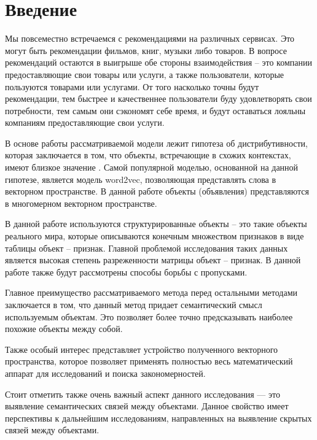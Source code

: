 \chapter*{Введение} %

Мы повсеместно встречаемся с рекомендациями на различных сервисах. Это могут быть рекомендации фильмов, книг, музыки либо товаров. В вопросе рекомендаций остаются в выигрыше обе стороны взаимодействия – это компании предоставляющие свои товары или услуги, а также пользователи, которые пользуются товарами или услугами. От того насколько точны будут рекомендации, тем
быстрее и качественнее пользователи буду удовлетворять свои потребности, тем самым они сэкономят себе время, и будут оставаться лояльны компаниям предоставляющие свои услуги.


В основе работы рассматриваемой модели лежит гипотеза об дистрибутивности, которая заключается в том, что объекты, встречающие в схожих контекстах, имеют близкое значение \cite{harris1954distributional}.  Самой популярной моделью, основанной на данной гипотезе, является модель word2vec, позволяющая представлять слова в векторном пространстве. В данной работе объекты (объявления) представляются в многомерном векторном пространстве.


В данной работе используются структурированные объекты – это такие объекты реального мира, которые описываются конечным множеством признаков в виде таблицы объект – признак. Главной проблемой исследования таких данных является высокая степень разреженности матрицы объект – признак. В данной работе также будут рассмотрены способы борьбы с пропусками.


Главное преимущество рассматриваемого метода перед остальными методами заключается в том, что данный метод придает семантический смысл используемым объектам. Это позволяет более точно предсказывать наиболее похожие объекты между собой. 


Также особый интерес представляет устройство полученного векторного пространства, которое позволяет применять полностью весь математический аппарат для исследований и поиска закономерностей.


Стоит отметить также очень важный аспект данного исследования — это выявление семантических связей между объектами. Данное свойство имеет перспективы к дальнейшим исследованиям, направленных на выявление скрытых связей между объектами.

